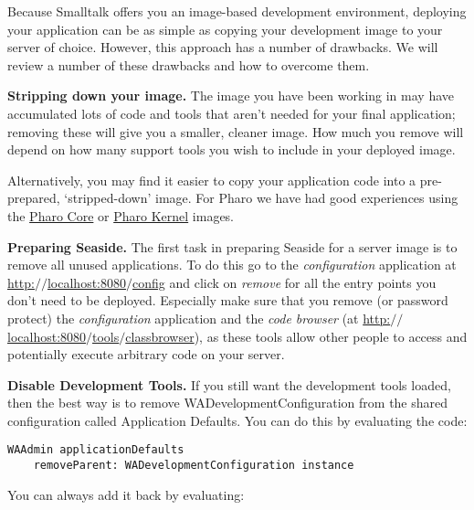 \documentclass[a4paper,10pt,twoside]{book}
\newcommand{\ct}[1]{{\small\ttfamily\textup{#1}}}
\begin{document}
Because Smalltalk offers you an image-based development environment, deploying your application can be as simple as copying your development image to your server of choice. However, this approach has a number of drawbacks. We will review a number of these drawbacks and how to overcome them.

\textbf{Stripping down your image.} The image you have been working in may have accumulated lots of code and tools that aren't needed for your final application; removing these will give you a smaller, cleaner image. How much you remove will depend on how many support tools you wish to include in your deployed image.

Alternatively, you may find it easier to copy your application code into a pre-prepared, `stripped-down' image. For Pharo we have had good experiences using the \href{http://www.pharo-project.org/}{Pharo Core} or \href{http://code.google.com/p/pharo/wiki/PharoKernel}{Pharo Kernel} images.

\textbf{Preparing Seaside.} The first task in preparing Seaside for a server image is to remove all unused applications. To do this go to the \textit{configuration} application at \href{http://localhost:8080/config}{http:$/$$/$localhost:8080$/$config} and click on \textit{remove} for all the entry points you don't need to be deployed. Especially make sure that you remove (or password protect) the \textit{configuration} application and the \textit{code browser} (at \href{http://localhost:8080/tools/classbrowser}{http:$/$$/$localhost:8080$/$tools$/$classbrowser}), as these tools allow other people to access and potentially execute arbitrary code on your server.

\label{book:advanced:deployment:deploymentpreparing:noteThebestwaytodeployistobuildafreshimagewithoutthedevelopmentthetestsandadmintoolpackagesloadedinthefirstplaceThatwillensurenothingdangerousisthereatall}

\textbf{Disable Development Tools.} If you still want the development tools loaded, then the best way is to remove  \ct{WADevelopmentConfiguration} from the shared configuration called Application Defaults. You can do this by evaluating the code:

\begin{lstlisting}
WAAdmin applicationDefaults
    removeParent: WADevelopmentConfiguration instance
\end{lstlisting}

You can always add it back by evaluating:
\end{document}
